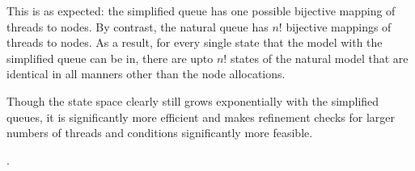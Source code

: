   This is as expected: the simplified queue has one possible bijective mapping of threads to nodes. By contrast, the natural queue has $n!$ bijective mappings of threads to nodes. As a result, for every single state that the model with the simplified queue can be in, there are upto $n!$ states of the natural model that are identical in all manners other than the node allocations.

  Though the state space clearly still grows exponentially with the simplified queues, it is significantly more efficient and makes refinement checks for larger numbers of threads and conditions significantly more feasible.

  .





   


  